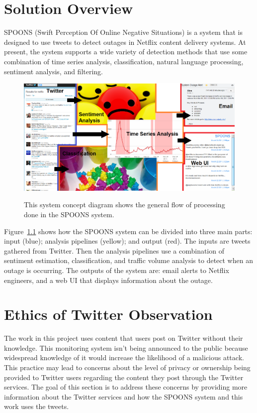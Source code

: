 \documentclass[12pt]{ucthesis}
\newcommand{\captionfonts}{\small\bf\ssp}
\begin{document}
\chapter{Solution Overview}
\label{overview}

SPOONS (Swift Perception Of Online Negative Situations) is a system that is
designed to use tweets to detect outages in Netflix content delivery systems.
At present, the system supports a wide variety of detection methods that use some combination of time
series analysis, classification, natural language processing, sentiment
analysis, and filtering.

\begin{figure}
   \begin{center}
      \includegraphics[width=140mm]{images/systemFlow.eps}
      \captionfonts
      \caption[System Concept Diagram]{This system concept diagram shows the general
                                       flow of processing done in the SPOONS system.}
      \label{fig:systemFlow}
   \end{center}
\end{figure}

Figure~\ref{fig:systemFlow} shows how the SPOONS system can be divided into three
main parts: input (blue); analysis pipelines (yellow); and output (red).
The inputs are tweets gathered from Twitter. Then the
analysis pipelines use a combination of sentiment estimation, classification, and
traffic volume analysis to detect when an outage is occurring.
The outputs of the system are: email alerts to Netflix engineers, and a web UI that displays
information about the outage.

\chapter{Ethics of Twitter Observation}

The work in this project uses content that users post on Twitter without their
knowledge. This monitoring system isn't being announced to the
public because widespread knowledge of it would increase the likelihood of a
malicious attack. This practice may lead to concerns about the level of privacy
or ownership being provided to Twitter users regarding the content they post
through the Twitter services. The goal of this section is to address these
concerns by providing more information about the Twitter services and how the
SPOONS system and this work uses the tweets.
\end{document}
